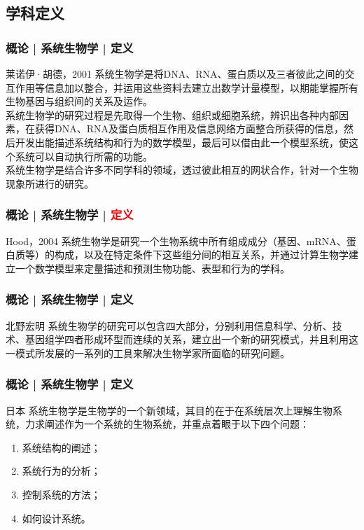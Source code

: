 \subsection{学科定义}
\begin{frame}
  \frametitle{概论 | 系统生物学 | 定义}
  \begin{block}{莱诺伊·胡德，2001}
    系统生物学是将DNA、RNA、蛋白质以及三者彼此之间的交互作用等信息加以整合，并运用这些资料去建立出数学计量模型，以期能掌握所有生物基因与组织间的关系及运作。\\
\vspace{1em}
系统生物学的研究过程是先取得一个生物、组织或细胞系统，辨识出各种内部因素，在获得DNA、RNA及蛋白质相互作用及信息网络方面整合所获得的信息，然后开发出能描述系统结构和行为的数学模型，最后可以借由此一个模型系统，使这个系统可以自动执行所需的功能。\\
\vspace{1em}
系统生物学是结合许多不同学科的领域，透过彼此相互的网状合作，针对一个生物现象所进行的研究。
  \end{block}
\end{frame}

\begin{frame}
  \frametitle{概论 | 系统生物学 | \textcolor{red}{定义}}
  \begin{block}{Hood，2004}
系统生物学是研究一个生物系统中所有组成成分（基因、mRNA、蛋白质等）的构成，以及在特定条件下这些组分间的相互关系，并通过计算生物学建立一个数学模型来定量描述和预测生物功能、表型和行为的学科。
  \end{block}
\end{frame}

\begin{frame}
  \frametitle{概论 | 系统生物学 | 定义}
  \begin{block}{北野宏明}
系统生物学的研究可以包含四大部分，分别利用信息科学、分析、技术、基因组学四者形成环型而连续的关系，建立出一个新的研究模式，并且利用这一模式所发展的一系列的工具来解决生物学家所面临的研究问题。
  \end{block}
\end{frame}

\begin{frame}
  \frametitle{概论 | 系统生物学 | 定义}
  \begin{block}{日本}
系统生物学是生物学的一个新领域，其目的在于在系统层次上理解生物系统，力求阐述作为一个系统的生物系统，并重点着眼于以下四个问题：
  \begin{enumerate}
    \item 系统结构的阐述；
    \item 系统行为的分析；
    \item 控制系统的方法；
    \item 如何设计系统。
  \end{enumerate}
  \end{block}
\end{frame}

